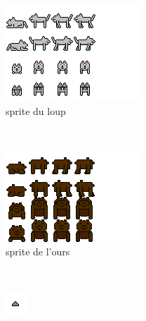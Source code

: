 \documentclass[a4paper, 11pt]{article}
\begin{document}
\begin{enumerate}
\begin{figure}[ht!]
 \centering
 \includegraphics[width=0.5\linewidth]{images/loup.png}
 \caption{sprite du loup}
 \label{fig::example::one}
\end{figure}
\\
\begin{figure}[ht!]
 \centering
 \includegraphics[width=0.5\linewidth]{images/ours.png}
 \caption{sprite de l'ours}
 \label{fig::example::one}
\end{figure}
\\
\begin{figure}[ht!]
  \begin{minipage}[c]{.5\linewidth}
   \centering
   \includegraphics[width=\linewidth]{images/caillou.png}

\end{minipage}
\end{figure}
\end{enumerate}
\end{document}
